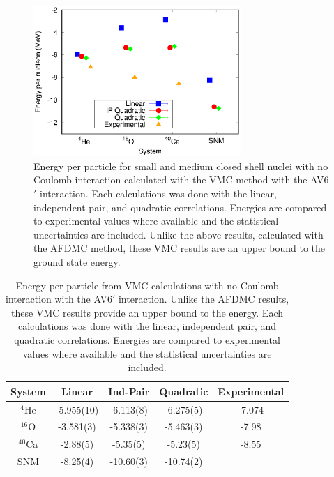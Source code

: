 \begin{figure}[h!]
   \centering
   \includegraphics[width=0.7\textwidth]{figures/energy_vmc.eps}
   \caption{Energy per particle for small and medium closed shell nuclei with no Coulomb interaction calculated with the VMC method with the AV6$'$ interaction. Each calculations was done with the linear, independent pair, and quadratic correlations. Energies are compared to experimental values where available and the statistical uncertainties are included. Unlike the above results, calculated with the AFDMC method, these VMC results are an upper bound to the ground state energy.}
   \label{fig:energies_vmc}
\end{figure}
\begin{table}[htb]
   \centering
   \begin{tabular}{ccccc}
      \hline\hline
      System & Linear & Ind-Pair & Quadratic & Experimental \\
      \hline
      $^4${He}    & -5.955(10)   & -6.113(8) & -6.275(5)    & -7.074 \\   
      $^{16}${O}  & -3.581(3)    & -5.338(3) & -5.463(3)    & -7.98  \\   
      $^{40}${Ca} & -2.88(5)     & -5.35(5)  & -5.23(5)     & -8.55  \\
      SNM         & -8.25(4)     & -10.60(3) & -10.74(2)    &        \\
      \hline\hline
   \end{tabular}
   \caption{Energy per particle from VMC calculations with no Coulomb interaction with the AV6$'$ interaction. Unlike the AFDMC results, these VMC results provide an upper bound to the energy. Each calculations was done with the linear, independent pair, and quadratic correlations. Energies are compared to experimental values where available and the statistical uncertainties are included.}
   \label{tab:energies_vmc}
\end{table}






